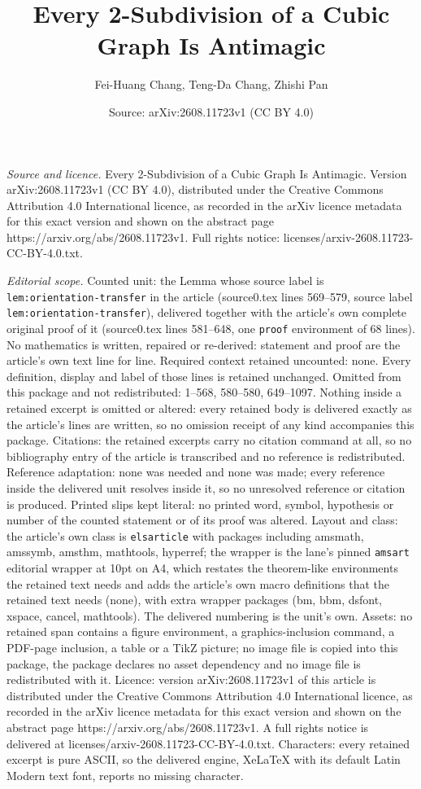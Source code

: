 \documentclass[10pt,a4paper]{amsart}
\title[Every 2-Subdivision of a Cubic Graph Is Antimagic]{Every 2-Subdivision of a Cubic Graph Is Antimagic}
\author{Fei-Huang Chang, Teng-Da Chang, Zhishi Pan}
\date{Source: arXiv:2608.11723v1 (CC BY 4.0)}
\begin{document}
\maketitle

\noindent\emph{Source and licence.} Every 2-Subdivision of a Cubic Graph Is Antimagic. Version arXiv:2608.11723v1 (CC BY 4.0), distributed under the Creative Commons Attribution 4.0 International licence, as recorded in the arXiv licence metadata for this exact version and shown on the abstract page https://arxiv.org/abs/2608.11723v1. Full rights notice: licenses/arxiv-2608.11723-CC-BY-4.0.txt.\par\smallskip

\noindent\textit{Editorial scope.} Counted unit: the Lemma whose source label is \texttt{lem:orientation-transfer} in the article (source0.tex lines 569--579, source label \texttt{lem:orientation-transfer}), delivered together with the article's own complete original proof of it (source0.tex lines 581--648, one \texttt{proof} environment of 68 lines). No mathematics is written, repaired or re-derived: statement and proof are the article's own text line for line. Required context retained uncounted: none. Every definition, display and label of those lines is retained unchanged. Omitted from this package and not redistributed: 1--568, 580--580, 649--1097. Nothing inside a retained excerpt is omitted or altered: every retained body is delivered exactly as the article's lines are written, so no omission receipt of any kind accompanies this package. Citations: the retained excerpts carry no citation command at all, so no bibliography entry of the article is transcribed and no reference is redistributed. Reference adaptation: none was needed and none was made; every reference inside the delivered unit resolves inside it, so no unresolved reference or citation is produced. Printed slips kept literal: no printed word, symbol, hypothesis or number of the counted statement or of its proof was altered. Layout and class: the article's own class is \texttt{elsarticle} with packages including amsmath, amssymb, amsthm, mathtools, hyperref; the wrapper is the lane's pinned \texttt{amsart} editorial wrapper at 10pt on A4, which restates the theorem-like environments the retained text needs and adds the article's own macro definitions that the retained text needs (none), with extra wrapper packages (bm, bbm, dsfont, xspace, cancel, mathtools). The delivered numbering is the unit's own. Assets: no retained span contains a figure environment, a graphics-inclusion command, a PDF-page inclusion, a table or a TikZ picture; no image file is copied into this package, the package declares no asset dependency and no image file is redistributed with it. Licence: version arXiv:2608.11723v1 of this article is distributed under the Creative Commons Attribution 4.0 International licence, as recorded in the arXiv licence metadata for this exact version and shown on the abstract page https://arxiv.org/abs/2608.11723v1. A full rights notice is delivered at licenses/arxiv-2608.11723-CC-BY-4.0.txt. Characters: every retained excerpt is pure ASCII, so the delivered engine, XeLaTeX with its default Latin Modern text font, reports no missing character.
\end{document}
